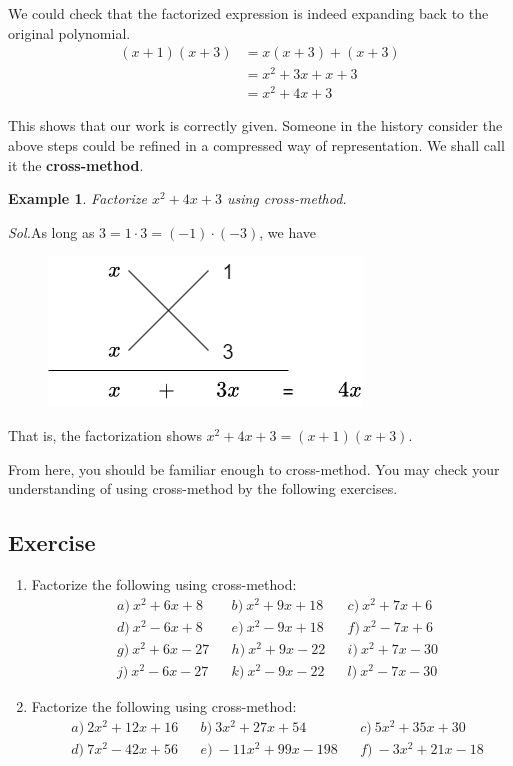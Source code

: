 \documentclass[12pt]{article}
\newtheorem{example}{Example}
\begin{document}
    We could check that the factorized expression is indeed expanding back to the original polynomial.\begin{align*}
        (x+1)(x+3)&=x(x+3)+(x+3)\\
        &=x^2+3x+x+3\\
        &=x^2+4x+3
    \end{align*}

    This shows that our work is correctly given. Someone in the history consider the above steps could be refined in a compressed way of representation. We shall call it the \textbf{cross-method}.
    
    \begin{example}
        Factorize $x^2+4x+3$ using cross-method.
    \end{example}

    \textit{ Sol.}As long as $3=1\cdot 3=(-1)\cdot(-3)$, we have 
    \begin{figure}[H]
        \centering
        \includegraphics[scale=0.6]{cross-method}
    \end{figure}
    \indent \indent That is, the factorization shows $x^2+4x+3=(x+1)(x+3)$.

    From here, you should be familiar enough to cross-method. You may check your understanding of using cross-method by the following exercises.

    \subsection*{Exercise}
    \begin{enumerate}
        \item Factorize the following using cross-method:\begin{align*}
            &a)\ x^2+6x+8&&b)\ x^2+9x+18&&c)\ x^2+7x+6\\
            &d)\ x^2-6x+8&&e)\ x^2-9x+18&&f)\ x^2-7x+6\\
            &g)\ x^2+6x-27&&h)\ x^2+9x-22&&i)\ x^2+7x-30\\
            &j)\ x^2-6x-27&&k)\ x^2-9x-22&&l)\ x^2-7x-30
        \end{align*}
        \item Factorize the following using cross-method:\begin{align*}
            &a)\ 2x^2+12x+16&&b)\ 3x^2+27x+54&&c)\ 5x^2+35x+30\\
            &d)\ 7x^2-42x+56&&e)\ -11x^2+99x-198&&f)\ -3x^2+21x-18
        \end{align*}
    \end{enumerate}
\end{document}
